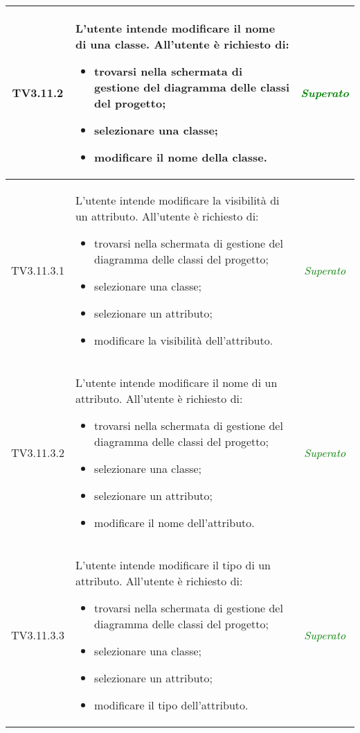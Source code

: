 \begin{longtable}{|c|>{}m{8cm}|c|}
\hypertarget{TV3.11.2}{TV3.11.2} & L'utente intende modificare il nome di una classe.
All'utente è richiesto di:
\begin{itemize}
	\item trovarsi nella schermata di gestione del diagramma delle classi del progetto;
	\item selezionare una classe;
	\item modificare il nome della classe.
\end{itemize} & \textcolor{Green}{\textit{Superato}}\\ \hline

\hypertarget{TV3.11.3.1}{TV3.11.3.1} & L'utente intende modificare la visibilità di un attributo.
All'utente è richiesto di:
\begin{itemize}
	\item trovarsi nella schermata di gestione del diagramma delle classi del progetto;
	\item selezionare una classe;
	\item selezionare un attributo;
	\item modificare la visibilità dell'attributo.
\end{itemize} & \textcolor{Green}{\textit{Superato}}\\ \hline

\hypertarget{TV3.11.3.2}{TV3.11.3.2} & L'utente intende modificare il nome di un attributo.
All'utente è richiesto di:
\begin{itemize}
	\item trovarsi nella schermata di gestione del diagramma delle classi del progetto;
	\item selezionare una classe;
	\item selezionare un attributo;
	\item modificare il nome dell'attributo.
\end{itemize} & \textcolor{Green}{\textit{Superato}}\\ \hline

\hypertarget{TV3.11.3.3}{TV3.11.3.3} & L'utente intende modificare il tipo di un attributo.
All'utente è richiesto di:
\begin{itemize}
	\item trovarsi nella schermata di gestione del diagramma delle classi del progetto;
	\item selezionare una classe;
	\item selezionare un attributo;
	\item modificare il tipo dell'attributo.
\end{itemize} & \textcolor{Green}{\textit{Superato}}\\ \hline


\end{longtable}
